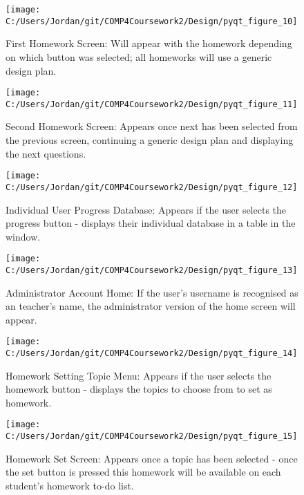 \begin{figure}[H]
    \label{fig:print_function_result}\caption{First Homework Screen: Will appear with the homework depending on which button was selected; all homeworks will use a generic design plan.}
    \texttt{[image: C:/Users/Jordan/git/COMP4Coursework2/Design/pyqt\_figure\_10]}
\end{figure}

\begin{figure}[H]
    \label{fig:print_function_result}\caption{Second Homework Screen: Appears once next has been selected from the previous screen, continuing a generic design plan and displaying the next questions.}
    \texttt{[image: C:/Users/Jordan/git/COMP4Coursework2/Design/pyqt\_figure\_11]}
\end{figure}

\begin{figure}[H]
    \label{fig:print_function_result}\caption{Individual User Progress Database: Appears if the user selects the progress button - displays their individual database in a table in the window.}
    \texttt{[image: C:/Users/Jordan/git/COMP4Coursework2/Design/pyqt\_figure\_12]}
\end{figure}

\begin{figure}[H]
    \label{fig:print_function_result}\caption{Administrator Account Home: If the user's username is recognised as an teacher's name, the administrator version of the home screen will appear.}
    \texttt{[image: C:/Users/Jordan/git/COMP4Coursework2/Design/pyqt\_figure\_13]}
\end{figure}

\begin{figure}[H]
    \label{fig:print_function_result}\caption{Homework Setting Topic Menu: Appears if the user selects the homework button - displays the topics to choose from to set as homework.}
    \texttt{[image: C:/Users/Jordan/git/COMP4Coursework2/Design/pyqt\_figure\_14]}
\end{figure}

\begin{figure}[H]
    \label{fig:print_function_result}\caption{Homework Set Screen: Appears once a topic has been selected - once the set button is pressed this homework will be available on each student's homework to-do list.}
    \texttt{[image: C:/Users/Jordan/git/COMP4Coursework2/Design/pyqt\_figure\_15]}
\end{figure}

